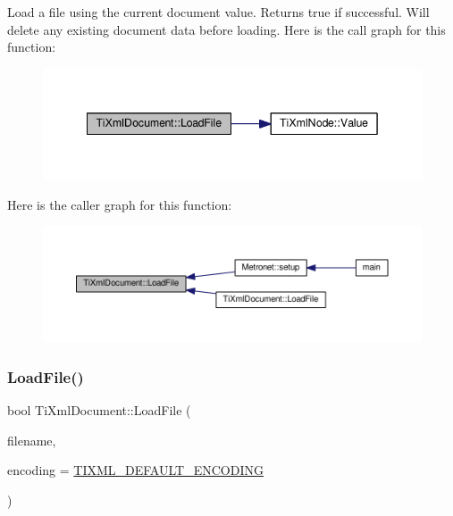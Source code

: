 Load a file using the current document value. Returns true if successful. Will delete any existing document data before loading. Here is the call graph for this function\+:\nopagebreak
\begin{figure}[H]
\begin{center}
\leavevmode
\includegraphics[width=342pt]{class_ti_xml_document_a4c852a889c02cf251117fd1d9fe1845f_cgraph}
\end{center}
\end{figure}
Here is the caller graph for this function\+:\nopagebreak
\begin{figure}[H]
\begin{center}
\leavevmode
\includegraphics[width=350pt]{class_ti_xml_document_a4c852a889c02cf251117fd1d9fe1845f_icgraph}
\end{center}
\end{figure}
\mbox{\label{class_ti_xml_document_a879cdf5e981b8b2d2ef82f2546dd28fb}} 
\subsubsection{\texorpdfstring{Load\+File()}{LoadFile()}\hspace{0.1cm}{\footnotesize\ttfamily [2/3]}}
{\footnotesize\ttfamily bool Ti\+Xml\+Document\+::\+Load\+File (\begin{DoxyParamCaption}\item[{const char $\ast$}]{filename,  }\item[{\hyperlink{tinyxml_8h_a88d51847a13ee0f4b4d320d03d2c4d96}{Ti\+Xml\+Encoding}}]{encoding = {\ttfamily \hyperlink{tinyxml_8h_ad5b8b092878e9010d6400cb6c13d4879}{T\+I\+X\+M\+L\+\_\+\+D\+E\+F\+A\+U\+L\+T\+\_\+\+E\+N\+C\+O\+D\+I\+NG}} }\end{DoxyParamCaption})}



